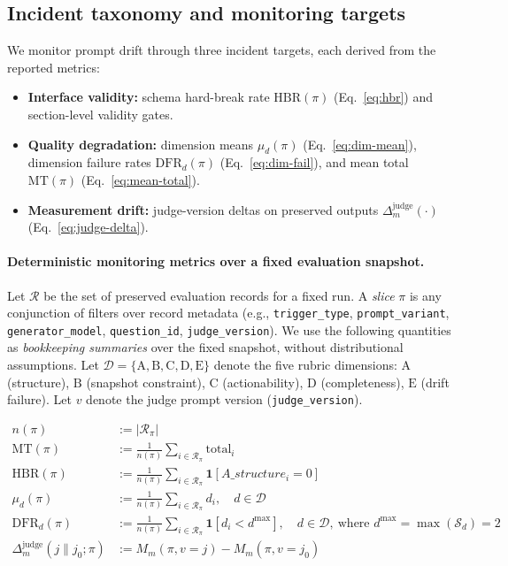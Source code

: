 \documentclass{article}
\newcommand{\Astruct}{A\_structure}
\begin{document}
\subsection{Incident taxonomy and monitoring targets}
We monitor prompt drift through three incident targets, each derived from the reported metrics:
\begin{itemize}[leftmargin=1.2em, itemsep=2pt, topsep=2pt]
  \item \textbf{Interface validity:} schema hard-break rate $\mathrm{HBR}(\pi)$ (Eq.~\ref{eq:hbr}) and section-level validity gates.
  \item \textbf{Quality degradation:} dimension means $\mu_d(\pi)$ (Eq.~\ref{eq:dim-mean}), dimension failure rates $\mathrm{DFR}_d(\pi)$ (Eq.~\ref{eq:dim-fail}), and mean total $\mathrm{MT}(\pi)$ (Eq.~\ref{eq:mean-total}).
  \item \textbf{Measurement drift:} judge-version deltas on preserved outputs $\Delta^{\text{judge}}_{m}(\cdot)$ (Eq.~\ref{eq:judge-delta}).
\end{itemize}

\paragraph{Deterministic monitoring metrics over a fixed evaluation snapshot.}
Let $\mathcal{R}$ be the set of preserved evaluation records for a fixed run.
A \emph{slice} $\pi$ is any conjunction of filters over record metadata (e.g., \texttt{trigger\_type}, \texttt{prompt\_variant}, \texttt{generator\_model}, \texttt{question\_id}, \texttt{judge\_version}).
We use the following quantities as \emph{bookkeeping summaries} over the fixed snapshot, without distributional assumptions.
Let $\mathcal{D}=\{\mathrm{A},\mathrm{B},\mathrm{C},\mathrm{D},\mathrm{E}\}$ denote the five rubric dimensions:
$\mathrm{A}$ (structure), $\mathrm{B}$ (snapshot constraint), $\mathrm{C}$ (actionability),
$\mathrm{D}$ (completeness), $\mathrm{E}$ (drift failure).
Let $v$ denote the judge prompt version (\texttt{judge\_version}).

\begin{align}
n(\pi) &:= \left|\mathcal{R}_{\pi}\right| \label{eq:coverage}\\
\mathrm{MT}(\pi) &:= \frac{1}{n(\pi)}\sum_{i\in \mathcal{R}_{\pi}} \mathrm{total}_i \label{eq:mean-total}\\
\mathrm{HBR}(\pi) &:= \frac{1}{n(\pi)}\sum_{i\in \mathcal{R}_{\pi}} \mathbf{1}\!\left[\Astruct_i = 0\right] \label{eq:hbr}\\
\mu_{d}(\pi) &:= \frac{1}{n(\pi)}\sum_{i\in \mathcal{R}_{\pi}} d_i,\quad d\in\mathcal{D} \label{eq:dim-mean}\\
\mathrm{DFR}_{d}(\pi) &:= \frac{1}{n(\pi)}\sum_{i\in \mathcal{R}_{\pi}} \mathbf{1}\!\left[d_i < d^{\max}\right],
\quad d\in\mathcal{D},\ \text{where } d^{\max}=\max(\mathcal{S}_d)=2 \label{eq:dim-fail}\\
\Delta^{\text{judge}}_{m}(j\parallel j_0;\pi) &:= M_{m}(\pi, v{=}j) - M_{m}(\pi, v{=}j_0) \label{eq:judge-delta}
\end{align}
\end{document}
